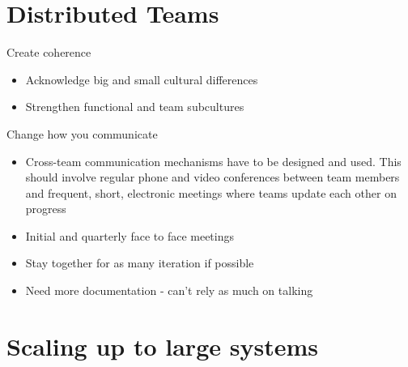 \documentclass{article}[18pt]
\begin{document}
\section{Distributed Teams}
Create coherence
\begin{itemize}
	\item Acknowledge big and small cultural differences
	\item Strengthen functional and team subcultures
\end{itemize}
Change how you communicate
\begin{itemize}
	\item Cross-team communication mechanisms have to be designed and used. This should involve regular phone and video conferences between team members and frequent, short, electronic meetings where teams update each other on progress
	\item Initial and quarterly face to face meetings
	\item Stay together for as many iteration if possible
	\item Need more documentation - can't rely as much on talking
\end{itemize}
\section{Scaling up to large systems}
\end{document}
